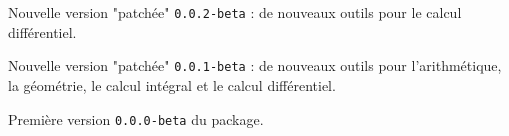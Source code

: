 \documentclass[12pt,a4paper]{article}
\theoremstyle{definition}
\begin{document}
\begin{description}[leftmargin=1em]

    \item[2017-10-18] Nouvelle version "patchée" \verb+0.0.2-beta+ : de nouveaux outils pour le calcul différentiel.


    \item[2017-10-06] Nouvelle version "patchée" \verb+0.0.1-beta+ : de nouveaux outils pour l'arithmétique, la géométrie, le calcul intégral et le calcul différentiel.


    \item[2017-10-02] Première version \verb+0.0.0-beta+ du package.
\end{description}
\end{document}
